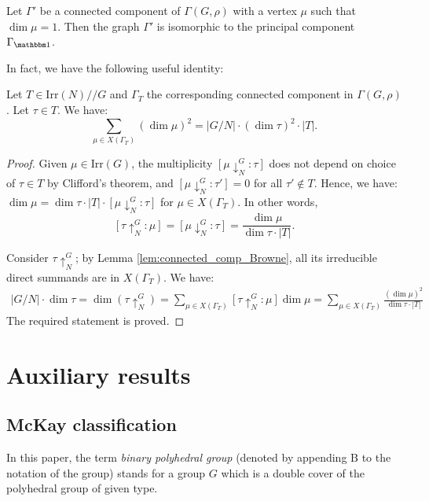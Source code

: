 \documentclass[ALCO]{cedram}
\newcommand{\triv}{{\mathbbm 1}}
\newcommand{\abs}[1]{\left|{#1}\right|}
\begin{document}
\begin{coro}\label{cor:conn_comp_isomorphic}
 Let $\Gamma'$ be a connected component of $\Gamma(G, \rho)$ with a vertex $\mu$ such that $\dim \mu=1$. Then the graph $\Gamma'$ is isomorphic to the principal component $\Gamma_{\triv}$.
\end{coro}


In fact, we have the following useful identity:
\begin{lemma}\label{lem:conn_comp_sum_of_sq}
  Let $T \in \mathrm{Irr}(N)//G$ and $\Gamma_T$ the corresponding connected component in $\Gamma(G, \rho)$. Let $\tau \in T$. We have:
 $$\sum_{\mu \in X(\Gamma_T)}(\dim \mu)^2 = \abs{G/N}\cdot (\dim\tau)^2 \cdot \abs{T}. $$
\end{lemma}
\begin{proof}

Given $\mu\in \mathrm{Irr}(G)$, the multiplicity $[\mu \downarrow^G_N: \tau]$ does not depend on choice of $\tau\in T$ by Clifford's theorem, and $[\mu \downarrow^G_N: \tau']=0$ for all $\tau'\notin T$. Hence, we have: $ \dim \mu = \dim \tau \cdot \abs{T} \cdot [\mu \downarrow^G_N: \tau] $ for $\mu \in X(\Gamma_T)$. In other words, $${[\tau\uparrow^G_N: \mu]}=[\mu \downarrow^G_N: \tau] = \frac{\dim \mu }{\dim \tau \cdot \abs{T}}.$$ 

Consider $\tau\uparrow^G_N$; by Lemma \ref{lem:connected_comp_Browne}, all its irreducible direct summands are in $X(\Gamma_T)$. We have: 
\begin{align*}
 \abs{G/N}\cdot\dim \tau  = \dim (\tau\uparrow^G_N) = \sum_{\mu \in X(\Gamma_T)}[\tau\uparrow^G_N: \mu]\dim \mu  = \sum_{\mu \in X(\Gamma_T)}\frac{(\dim \mu )^2}{\dim \tau  \cdot \abs{T}}
\end{align*}
The required statement is proved.
 
\end{proof}

\section{Auxiliary results}\label{sec:Aux}



\subsection{McKay classification}\label{ssec:mckay_class}
In this paper, the term {\it binary polyhedral group} (denoted by appending $\mathrm{B}$ to the notation of the 
group) stands for a group $G$ which is a double cover
of the polyhedral group of given type. 
\end{document}
